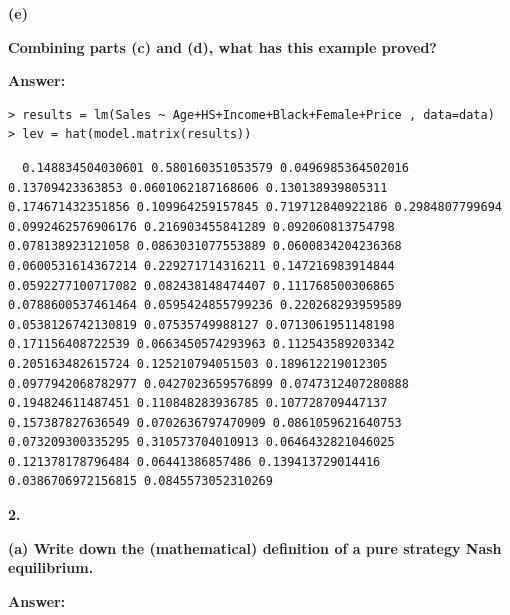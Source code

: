 \documentclass[letterpaper,11pt]{article}
\begin{document}
\begin{addmargin}[-1.1em]{0em}
\textbf{(e)}\par\end{addmargin}
  \textbf{Combining parts (c) and (d), what has this example proved?}\par
\bigbreak
\begin{addmargin}[-0.5em]{0em}
\textbf{Answer: }\end{addmargin}


\begin{lstlisting}
> results = lm(Sales ~ Age+HS+Income+Black+Female+Price , data=data)
> lev = hat(model.matrix(results))
\end{lstlisting}

\begin{lstlisting}
  0.148834504030601 0.580160351053579 0.0496985364502016 0.13709423363853 0.0601062187168606 0.130138939805311 0.174671432351856 0.109964259157845 0.719712840922186 0.2984807799694 0.0992462576906176 0.216903455841289 0.092060813754798 0.078138923121058 0.0863031077553889 0.0600834204236368 0.0600531614367214 0.229271714316211 0.147216983914844 0.0592277100717082 0.082438148474407 0.111768500306865 0.0788600537461464 0.0595424855799236 0.220268293959589 0.0538126742130819 0.07535749988127 0.0713061951148198 0.171156408722539 0.0663450574293963 0.112543589203342 0.205163482615724 0.125210794051503 0.189612219012305 0.0977942068782977 0.0427023659576899 0.0747312407280888 0.194824611487451 0.110848283936785 0.107728709447137 0.157387827636549 0.0702636797470909 0.0861059621640753 0.073209300335295 0.310573704010913 0.0646432821046025 0.121378178796484 0.06441386857486 0.139413729014416 0.0386706972156815 0.0845573052310269
\end{lstlisting}







\begin{addmargin}[-2em]{0em} \large{\textbf{2. }}\end{addmargin}
  \begin{addmargin}[-1.1em]{0em} \textbf{(a) Write down the (mathematical) definition of a pure strategy Nash equilibrium.}\par\end{addmargin}
    \textbf{}\par
  \bigbreak
  \begin{addmargin}[-0.5em]{0em}
  \textbf{Answer: }\end{addmargin}
\end{document}
